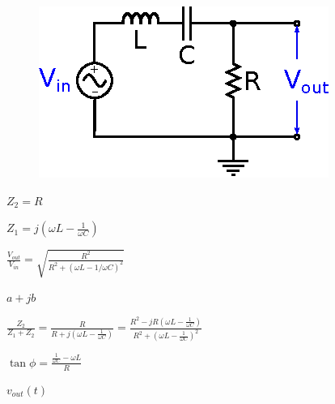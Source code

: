 \documentclass[11pt]{article}
\def\lthtmlcheckvsize{\ifdim\ht\sizebox<\vsize 
  \ifdim\wd\sizebox<\hsize\expandafter\hfill\fi \expandafter\vfill
  \else\expandafter\vss\fi}%
\begin{document}
{\newpage\clearpage
{}%
\begin{figure}  \begin{center}
    \includegraphics{rlccircuit.eps}
    
  \end{center}
\end{figure}%
\lthtmlfigureZ
\lthtmlcheckvsize\clearpage}

{\newpage\clearpage
{}%
$Z_2 = R$%
\lthtmlindisplaymathZ
\lthtmlcheckvsize\clearpage}

{\newpage\clearpage
{}%
$\displaystyle Z_1 = j \left( \omega L - \frac{1}{\omega C} \right)
$%
\lthtmlindisplaymathZ
\lthtmlcheckvsize\clearpage}

{\newpage\clearpage
{}%
$\displaystyle \frac{V_{out}}{V_{in}} = \sqrt{\frac{R^2}{R^2 + (\omega L - 1/\omega C)^2}}
$%
\lthtmlindisplaymathZ
\lthtmlcheckvsize\clearpage}

{\newpage\clearpage
{}%
$a + jb$%
\lthtmlindisplaymathZ
\lthtmlcheckvsize\clearpage}

{\newpage\clearpage
{}%
$\displaystyle \frac{Z_2}{Z_1 + Z_2}
  = \frac{R}{R + j \left( \omega L - \frac{1}{\omega C} \right)}
  = \frac{R^2 - j R \left( \omega L - \frac{1}{\omega C} \right)}
         {R^2 + \left( \omega L - \frac{1}{\omega C} \right)^2}
$%
\lthtmlindisplaymathZ
\lthtmlcheckvsize\clearpage}

{\newpage\clearpage
{}%
$\displaystyle \tan \phi = \frac{\frac{1}{\omega C} - \omega L}{R}
$%
\lthtmlindisplaymathZ
\lthtmlcheckvsize\clearpage}

{\newpage\clearpage
{}%
$v_{out}(t)$%
\lthtmlindisplaymathZ
\lthtmlcheckvsize\clearpage}
\end{document}
